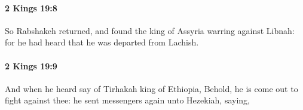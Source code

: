		\paragraph{2 Kings 19:8} %
			\label{2KINGS-19-8}

			So Rabshakeh returned, and found the king of Assyria warring against Libnah: for he had heard that he was departed from Lachish.


		\paragraph{2 Kings 19:9} %
			\label{2KINGS-19-9}

			And when he heard say of Tirhakah king of Ethiopia, Behold, he is come out to fight against thee: he sent messengers again unto Hezekiah, saying,


